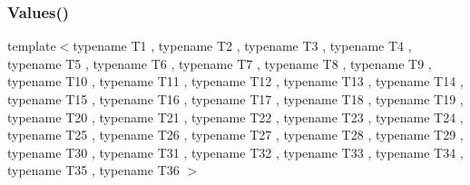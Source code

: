 \subsubsection{\texorpdfstring{Values()}{Values()}\hspace{0.1cm}{\footnotesize\ttfamily [36/50]}}
{\footnotesize\ttfamily template$<$typename T1 , typename T2 , typename T3 , typename T4 , typename T5 , typename T6 , typename T7 , typename T8 , typename T9 , typename T10 , typename T11 , typename T12 , typename T13 , typename T14 , typename T15 , typename T16 , typename T17 , typename T18 , typename T19 , typename T20 , typename T21 , typename T22 , typename T23 , typename T24 , typename T25 , typename T26 , typename T27 , typename T28 , typename T29 , typename T30 , typename T31 , typename T32 , typename T33 , typename T34 , typename T35 , typename T36 $>$ \\
}
